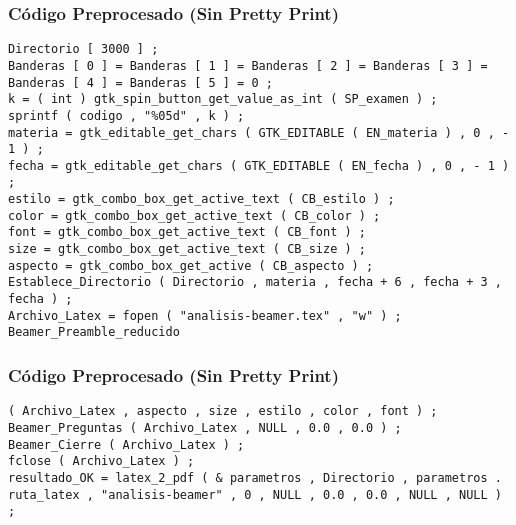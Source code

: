 \documentclass{beamer}
\begin{document}
\begin{frame}[fragile]
\frametitle{C\'odigo Preprocesado (Sin Pretty Print)}
\begin{lstlisting}[style=CStyle]
Directorio [ 3000 ] ; 
Banderas [ 0 ] = Banderas [ 1 ] = Banderas [ 2 ] = Banderas [ 3 ] = Banderas [ 4 ] = Banderas [ 5 ] = 0 ; 
k = ( int ) gtk_spin_button_get_value_as_int ( SP_examen ) ; 
sprintf ( codigo , "%05d" , k ) ; 
materia = gtk_editable_get_chars ( GTK_EDITABLE ( EN_materia ) , 0 , - 1 ) ; 
fecha = gtk_editable_get_chars ( GTK_EDITABLE ( EN_fecha ) , 0 , - 1 ) ; 
estilo = gtk_combo_box_get_active_text ( CB_estilo ) ; 
color = gtk_combo_box_get_active_text ( CB_color ) ; 
font = gtk_combo_box_get_active_text ( CB_font ) ; 
size = gtk_combo_box_get_active_text ( CB_size ) ; 
aspecto = gtk_combo_box_get_active ( CB_aspecto ) ; 
Establece_Directorio ( Directorio , materia , fecha + 6 , fecha + 3 , fecha ) ; 
Archivo_Latex = fopen ( "analisis-beamer.tex" , "w" ) ; 
Beamer_Preamble_reducido \end{lstlisting}
\end{frame}
\begin{frame}[fragile]
\frametitle{C\'odigo Preprocesado (Sin Pretty Print)}
\begin{lstlisting}[style=CStyle]
( Archivo_Latex , aspecto , size , estilo , color , font ) ; 
Beamer_Preguntas ( Archivo_Latex , NULL , 0.0 , 0.0 ) ; 
Beamer_Cierre ( Archivo_Latex ) ; 
fclose ( Archivo_Latex ) ; 
resultado_OK = latex_2_pdf ( & parametros , Directorio , parametros . ruta_latex , "analisis-beamer" , 0 , NULL , 0.0 , 0.0 , NULL , NULL ) ; \end{lstlisting}
\end{frame}
\end{document}

